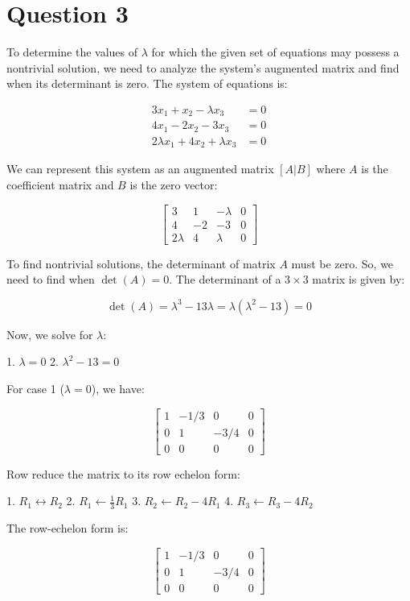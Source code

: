 \section{Question 3}
To determine the values of $\lambda$ for which the given set of equations may possess a nontrivial solution, we need to analyze the system's augmented matrix and find when its determinant is zero. The system of equations is:


\begin{align*}
3x_1 + x_2 - \lambda x_3 &= 0 \\
4x_1 - 2x_2 - 3x_3 &= 0 \\
2\lambda x_1 + 4x_2 + \lambda x_3 &= 0
\end{align*}


We can represent this system as an augmented matrix $[A|B]$ where $A$ is the coefficient matrix and $B$ is the zero vector:

\[
\begin{bmatrix}
3 & 1 & -\lambda & 0 \\
4 & -2 & -3 & 0 \\
2\lambda & 4 & \lambda & 0
\end{bmatrix}
\]

To find nontrivial solutions, the determinant of matrix $A$ must be zero. So, we need to find when $\det(A) = 0$. The determinant of a $3\times3$ matrix is given by:

\[
\det(A) = \lambda^3 - 13\lambda = \lambda(\lambda^2 - 13) = 0
\]

Now, we solve for $\lambda$:

1. $\lambda = 0$
2. $\lambda^2 - 13 = 0$

For case 1 ($\lambda = 0$), we have:

\[
\begin{bmatrix}
1 & -1/3 & 0 & 0 \\
0 & 1 & -3/4 & 0 \\
0 & 0 & 0 & 0
\end{bmatrix}
\]

Row reduce the matrix to its row echelon form:

1. $R_1 \leftrightarrow R_2$
2. $R_1 \leftarrow \frac{1}{3}R_1$
3. $R_2 \leftarrow R_2 - 4R_1$
4. $R_3 \leftarrow R_3 - 4R_2$

The row-echelon form is:

\[
\begin{bmatrix}
1 & -1/3 & 0 & 0 \\
0 & 1 & -3/4 & 0 \\
0 & 0 & 0 & 0
\end{bmatrix}
\]


